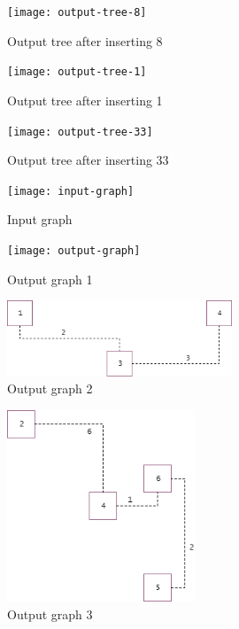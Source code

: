 \documentclass {article}
\begin{document}
\begin{figure}[H]
\centering
\texttt{[image: output-tree-8]}

\caption{Output tree after inserting 8}
\label{fig:output-tree-8}
\end{figure}
 
\begin{figure}[H]
\texttt{[image: output-tree-1]}

\caption{Output tree after inserting 1}
\label{fig:output-tree-1}
\end{figure}
 
\begin{figure}[H]
\texttt{[image: output-tree-33]}

\caption{Output tree after inserting 33}
\label{fig:output-tree-33}
\end{figure}
 
\begin{figure}[H]
\centering
\texttt{[image: input-graph]}

\caption{Input graph}
\label{fig:input-graph}
\end{figure}
 
\begin{figure}[H]
\centering
\texttt{[image: output-graph]}

\caption{Output graph 1}
\label{fig:output-graph}
\end{figure}
 
\begin{figure}[H]
\centering
\includegraphics[width=0.6\textwidth]{output-graph2}

\caption{Output graph 2}
\label{fig:output-graph2}
\end{figure}
 
\begin{figure}[H]
\centering
\includegraphics[width=0.5\textwidth]{output-graph3}

\caption{Output graph 3}
\label{fig:output-graph3}
\end{figure}
 
\end{document}
